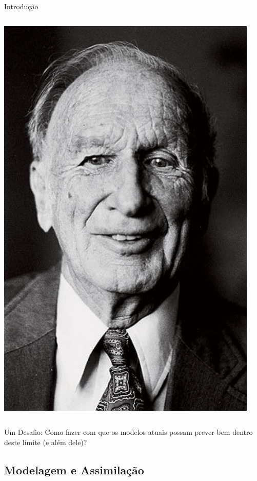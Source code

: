 \documentclass[10pt,aspectratio=169]{beamer}
\begin{document}
\begin{frame}[fragile]{Introdução}
\begin{columns}[onlytextwidth,T]
      \includegraphics[scale=0.15]{figs/lorenz.pdf} 
  \end{columns}
  \pause
  \begin{block}{Um Desafio:}
    \vspace{0.5em}
    Como fazer com que os modelos atuais possam prever bem dentro deste limite (e além dele)?
  \end{block}
\end{frame}

\subsection{Modelagem e Assimilação}
\end{document}
